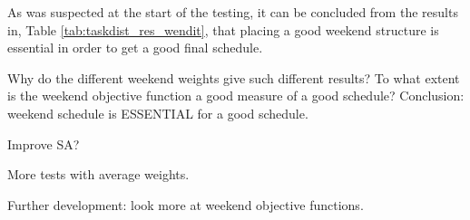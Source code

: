 As was suspected at the start of the testing, it can be concluded from the results in, Table \ref{tab:taskdist_res_wendit}, that placing a good weekend structure is essential in order to get a good final schedule. 


Why do the different weekend weights give such different results?
To what extent is the weekend objective function a good measure of a good schedule?
Conclusion: weekend schedule is ESSENTIAL for a good schedule.

Improve SA?

More tests with average weights.

Further development: look more at weekend objective functions.

